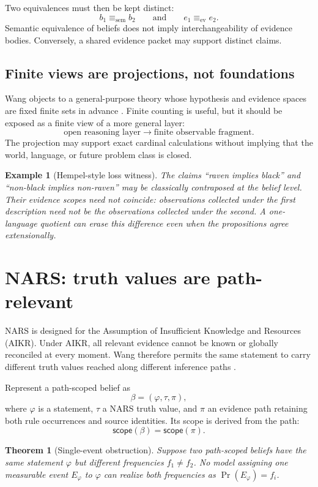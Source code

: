 \documentclass[11pt]{article}
\newtheorem{theorem}[definition]{Theorem}
\newtheorem{example}[definition]{Example}
\theoremstyle{remark}
\newcommand{\Scope}{\mathsf{scope}}
\begin{document}
Two equivalences must then be kept distinct:
\[
  b_1 \equiv_{\mathrm{sem}} b_2
  \qquad\text{and}\qquad
  e_1 \equiv_{\mathrm{ev}} e_2.
\]
Semantic equivalence of beliefs does not imply interchangeability of evidence
bodies.  Conversely, a shared evidence packet may support distinct claims.

\subsection{Finite views are projections, not foundations}

Wang objects to a general-purpose theory whose hypothesis and evidence spaces
are fixed finite sets in advance \cite{wang2009}.  Finite counting is useful,
but it should be exposed as a finite view of a more general layer:
\[
  \text{open reasoning layer}
   \longrightarrow
  \text{finite observable fragment}.
\]
The projection may support exact cardinal calculations without implying that
the world, language, or future problem class is closed.

\begin{example}[Hempel-style loss witness]
The claims ``raven implies black'' and ``non-black implies non-raven'' may be
classically contraposed at the belief level.  Their evidence scopes need not
coincide: observations collected under the first description need not be the
observations collected under the second.  A one-language quotient can erase
this difference even when the propositions agree extensionally.
\end{example}

\section{NARS: truth values are path-relevant}

NARS is designed for the Assumption of Insufficient Knowledge and Resources
(AIKR).  Under AIKR, all relevant evidence cannot be known or globally
reconciled at every moment.  Wang therefore permits the same statement to
carry different truth values reached along different inference paths
\cite{wang2009}.

Represent a path-scoped belief as
\[
  \beta=(\varphi,\tau,\pi),
\]
where $\varphi$ is a statement, $\tau$ a NARS truth value, and $\pi$ an
evidence path retaining both rule occurrences and source identities.  Its
scope is derived from the path:
\[
  \Scope(\beta)=\Scope(\pi).
\]

\begin{theorem}[Single-event obstruction]
Suppose two path-scoped beliefs have the same statement $\varphi$ but different
frequencies $f_1\neq f_2$.  No model assigning one measurable event
$E_\varphi$ to $\varphi$ can realize both frequencies as
$\Pr(E_\varphi)=f_i$.
\end{theorem}
\end{document}
